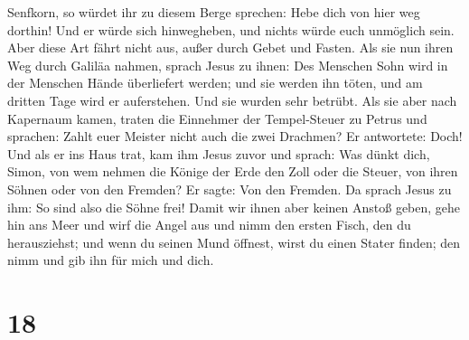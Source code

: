 Senfkorn, so würdet ihr zu diesem Berge sprechen: Hebe dich von hier weg
dorthin! Und er würde sich hinwegheben, und nichts würde euch unmöglich
sein.  Aber diese Art fährt nicht aus, außer durch Gebet
und Fasten.  Als sie nun ihren Weg durch Galiläa nahmen,
sprach Jesus zu ihnen: Des Menschen Sohn wird in der Menschen Hände
überliefert werden;  und sie werden ihn töten, und am
dritten Tage wird er auferstehen. Und sie wurden sehr betrübt.
 Als sie aber nach Kapernaum kamen, traten die Einnehmer
der Tempel-Steuer zu Petrus und sprachen: Zahlt euer Meister nicht auch
die zwei Drachmen?  Er antwortete: Doch! Und als er ins
Haus trat, kam ihm Jesus zuvor und sprach: Was dünkt dich, Simon, von
wem nehmen die Könige der Erde den Zoll oder die Steuer, von ihren
Söhnen oder von den Fremden?  Er sagte: Von den Fremden.
Da sprach Jesus zu ihm: So sind also die Söhne frei! 
Damit wir ihnen aber keinen Anstoß geben, gehe hin ans Meer und wirf die
Angel aus und nimm den ersten Fisch, den du herausziehst; und wenn du
seinen Mund öffnest, wirst du einen Stater finden; den nimm und gib ihn
für mich und dich.

\hypertarget{section-17}{%
\section{18}\label{section-17}}

